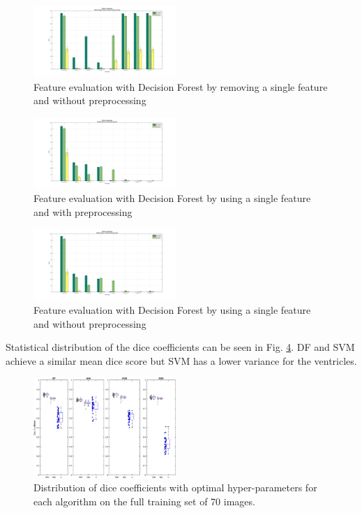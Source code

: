 \documentclass[journal]{IEEEtran}
\begin{document}
\begin{figure}\label{DF_FeatEval_WSF_NPP}
	\centering
	\includegraphics[width=0.48\textwidth]{images/DF_FeatEval_WSF_NPP}
	\caption{Feature evaluation with Decision Forest by removing a single feature and without preprocessing}
\end{figure}

\begin{figure}\label{DF_FeatEval_SF_PP}
	\centering
	\includegraphics[width=0.48\textwidth]{images/DF_FeatEval_SF_PP}
	\caption{Feature evaluation with Decision Forest by using a single feature and with preprocessing }
\end{figure}

\begin{figure}\label{DF_FeatEval_SF_NPP}
	\centering
	\includegraphics[width=0.48\textwidth]{images/DF_FeatEval_SF_NPP}
	\caption{Feature evaluation with Decision Forest by using a single feature and without preprocessing }
\end{figure}

Statistical distribution of the dice coefficients can be seen in Fig. \ref{f.boxplot}. DF and SVM achieve a similar mean dice score but SVM has a lower variance for the ventricles.
\begin{figure}\label{f.boxplot}
	\centering
	\includegraphics[width=0.48\textwidth]{images/boxplot}
	\caption{Distribution of dice coefficients with optimal hyper-parameters for each algorithm on the full training set of 70 images.}
\end{figure}
\end{document}
